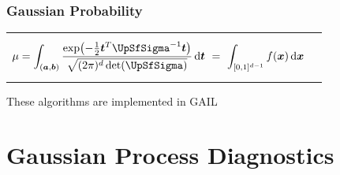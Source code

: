 \documentclass[10pt,compress,xcolor={usenames,dvipsnames},aspectratio=169]{beamer}
\begin{document}
 \begin{frame}[label=GaussProb]
 	\frametitle{Gaussian Probability}
 	\vspace{-8ex}
 	\begin{tabular}{m{}m{3cm}}
 		\begin{equation*}
 		\mu = \int_{(\va,\vb)} \frac{\exp\bigl(- \frac 12 \vt^T \mSigma^{-1} \vt 
 			\bigr)}{\sqrt{(2 
 				\pi)^d \det(\mSigma)}} \, \dif \vt \
 		= \ \int_{[0,1]^{d-1}} 
 		f(\vx) \, 
 		\dif \vx
 		\end{equation*}
 		& 
 	\end{tabular}
 	 	
 	\vspace{-4ex}
 	


%

 	\vspace{-2ex}
 	
 	These algorithms are implemented in GAIL
 
 
 
\end{frame}


\section{Gaussian Process Diagnostics}
\end{document}
